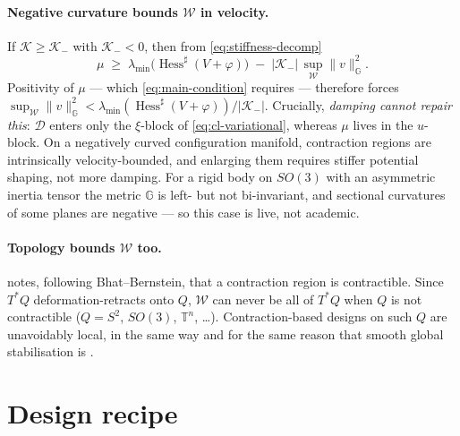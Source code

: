 \documentclass[11pt,a4paper]{article}
\newcommand{\Gm}{\mathbb{G}}                      %
\newcommand{\Hess}{\operatorname{Hess}}
\newcommand{\Sect}{\mathcal{K}}
\newcommand{\Damp}{\mathcal{D}}
\newcommand{\normG}[1]{\lVert #1 \rVert_{\Gm}}
\newcommand{\Tstar}{T^{*}Q}
\theoremstyle{plain}
\theoremstyle{definition}
\theoremstyle{remark}
\begin{document}
\paragraph{Negative curvature bounds $\mathcal{W}$ in velocity.} If
$\Sect \ge \Sect_{-}$ with $\Sect_{-} < 0$, then from
\eqref{eq:stiffness-decomp}
\[
  \mu \;\ge\; \lambda_{\min}\!\big(\Hess^{\sharp}(V+\varphi)\big)
              \;-\; |\Sect_{-}|\,\sup_{\mathcal{W}}\normG{v}^2 .
\]
Positivity of $\mu$ --- which \eqref{eq:main-condition} requires --- therefore
forces $\sup_{\mathcal{W}}\normG{v}^2 <
\lambda_{\min}(\Hess^{\sharp}(V+\varphi))/|\Sect_{-}|$. Crucially,
\emph{damping cannot repair this}: $\Damp$ enters only the $\xi$-block of
\eqref{eq:cl-variational}, whereas $\mu$ lives in the $u$-block. On a negatively
curved configuration manifold, contraction regions are intrinsically
velocity-bounded, and enlarging them requires stiffer potential shaping, not more
damping. For a rigid body on $SO(3)$ with an asymmetric inertia tensor the metric
$\Gm$ is left- but not bi-invariant, and sectional curvatures of some planes are
negative --- so this case is live, not academic.

\paragraph{Topology bounds $\mathcal{W}$ too.} \cite[\S2]{SB13} notes, following
Bhat--Bernstein, that a contraction region is contractible. Since $\Tstar$
deformation-retracts onto $Q$, $\mathcal{W}$ can never be all of $\Tstar$ when $Q$
is not contractible ($Q = S^2$, $SO(3)$, $\mathbb{T}^n$, \dots). Contraction-based
designs on such $Q$ are unavoidably local, in the same way and for the same reason
that smooth global stabilisation is \cite[\S10.5.7]{BL04}.

\section{Design recipe}
\label{sec:recipe}
\end{document}
